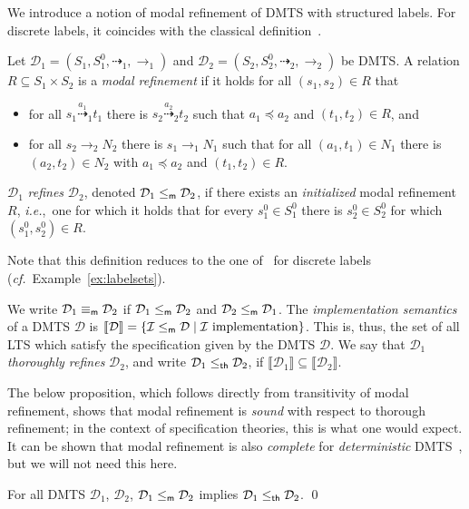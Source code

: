 \documentclass[twocolumn]{svjour3-dummy}
\newcommand*\labpre{\preccurlyeq}
\newcommand*\ie{\textit{i.e.},}
\newcommand*\cf{\textit{cf.}\xspace}
\newcommand*\impl[1]{\llbracket #1\rrbracket}
\newcommand*\cI{\mathcal I}
\newcommand*{\must}[1]{\overset{#1}{\longrightarrow}}
\newcommand*{\omust}{\mathord{\must{}}}
\newcommand*\cD{\mathcal D}
\newcommand*{\may}[1]{\overset{#1}{\dashrightarrow}}
\newcommand*{\omay}{\mathord{\may{}}}
\newcommand*\mr{\le_\textup{\textsf{m}}}
\newcommand*\mreq{\equiv_\textup{\textsf{m}}}
\newcommand*\tr{\le_\textup{\textsf{th}}}
\newcommand*\noproof{\qed}
\begin{document}
We introduce a notion of modal refinement of DMTS with structured
labels.  For discrete labels, it coincides with the classical
definition~\cite{DBLP:conf/lics/LarsenX90}.

\begin{definition}
  Let $\cD_1=( S_1, S^0_1, \omay_1, \omust_1)$ and $\cD_2=( S_2, S^0_2,
  \omay_2, \omust_2)$ be DMTS.  A relation $R\subseteq S_1\times S_2$ is
  a \emph{modal refinement} if it holds for all $( s_1, s_2)\in R$ that
  \begin{itemize}
  \item for all $s_1\may{ a_1}_1 t_1$ there is $s_2\may{ a_2}_2 t_2$
    such that $a_1\labpre a_2$ and $( t_1, t_2)\in R$, and
  \item for all $s_2\must{}_2 N_2$ there is $s_1\must{}_1 N_1$ such that
    for all $( a_1, t_1)\in N_1$ there is $( a_2, t_2)\in N_2$ with
    $a_1\labpre a_2$ and $( t_1, t_2)\in R$.
  \end{itemize}
  $\cD_1$ \emph{refines} $\cD_2$, denoted $\cD_1\mr \cD_2$, if there
  exists an \emph{initialized} modal refinement $R$, \ie~one for which
  it holds that for every $s_1^0\in S_1^0$ there is $s_2^0\in S_2^0$ for
  which $( s_1^0, s_2^0)\in R$.
\end{definition}

Note that this definition reduces to the one
of~\cite{DBLP:conf/lics/LarsenX90, DBLP:conf/atva/BenesCK11} for
discrete labels (\cf~Example~\ref{ex:labelsets}).

We write $\cD_1\mreq \cD_2$ if $\cD_1\mr \cD_2$ and $\cD_2\mr \cD_1$.
The \emph{implementation semantics} of a DMTS $\cD$ is $\impl \cD=\{
\cI\mr \cD\mid \cI~\text{implementation}\}$.  This is, thus, the set of
all LTS which satisfy the specification given by the DMTS $\cD$.  We say
that $\cD_1$ \emph{thoroughly refines} $\cD_2$, and write $\cD_1\tr
\cD_2$, if $\impl{ \cD_1}\subseteq \impl{ \cD_2}$.

The below proposition, which follows directly from transitivity of modal
refinement, shows that modal refinement is \emph{sound} with respect to
thorough refinement; in the context of specification theories, this is
what one would expect.  It can be shown that modal refinement is also
\emph{complete} for \emph{deterministic}
DMTS~\cite{DBLP:journals/tcs/BenesKLS09}, but we will not need this
here.

\begin{proposition}\label{prop:mrtr}
  \label{pr:mrvstr}
  For all DMTS $\cD_1$, $\cD_2$, $\cD_1\mr \cD_2$ implies $\cD_1\tr
  \cD_2$. \noproof
\end{proposition}
\end{document}

